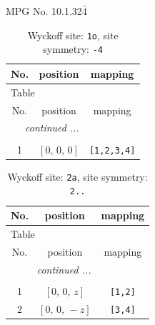 \documentclass[fleqn,8pt]{jsarticle}
\begin{document}
\setcounter{MaxMatrixCols}{32}

\renewcommand{\tablename}{Table~}
\renewcommand{\figurename}{Figure~}
\begin{center}
\LARGE
MPG No. 10.1.32\quad$\bar{4}$
\end{center}
\renewcommand{\arraystretch}{1.2}
\begin{longtable}{ccc}
\caption{Wyckoff site: {\tt 1o}, site symmetry: {\tt -4}}
 \\
 \hline \hline
No. & position & mapping \\ \hline \endfirsthead

\multicolumn{2}{l}{\tablename\ \thetable{}} \\
 \hline \hline
No. & position & mapping \\ \hline \endhead

 \hline \hline
\multicolumn{2}{r}{\footnotesize\it continued ...} \\ \endfoot

 \hline \hline
\multicolumn{2}{r}{} \\ \endlastfoot

1 & $\left[ 0,\, 0,\, 0 \right]$ & {\tt [1,2,3,4]} \\
\end{longtable}
\renewcommand{\arraystretch}{1.2}
\begin{longtable}{ccc}
\caption{Wyckoff site: {\tt 2a}, site symmetry: {\tt 2..}}
 \\
 \hline \hline
No. & position & mapping \\ \hline \endfirsthead

\multicolumn{2}{l}{\tablename\ \thetable{}} \\
 \hline \hline
No. & position & mapping \\ \hline \endhead

 \hline \hline
\multicolumn{2}{r}{\footnotesize\it continued ...} \\ \endfoot

 \hline \hline
\multicolumn{2}{r}{} \\ \endlastfoot

1 & $\left[ 0,\, 0,\, z \right]$ & {\tt [1,2]} \\ \hline
2 & $\left[ 0,\, 0,\, - z \right]$ & {\tt [3,4]} \\
\end{longtable}
\renewcommand{\arraystretch}{1.2}
\end{document}
